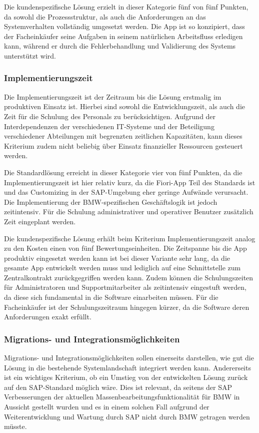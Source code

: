 Die kundenspezifische Lösung erzielt in dieser Kategorie fünf von fünf Punkten, da sowohl die Prozessstruktur, als auch die Anforderungen an das Systemverhalten vollständig umgesetzt werden. Die App ist so konzipiert, dass der Facheinkäufer seine Aufgaben in seinem natürlichen Arbeitsfluss erledigen kann, während er durch die Fehlerbehandlung und Validierung des Systems unterstützt wird. 

\subsubsection{Implementierungszeit}

Die Implementierungszeit ist der Zeitraum bis die Lösung erstmalig im produktiven Einsatz ist. Hierbei sind sowohl die Entwicklungszeit, als auch die Zeit für die Schulung des Personals zu berücksichtigen. Aufgrund der Interdependenzen der verschiedenen IT-Systeme und der Beteiligung verschiedener Abteilungen mit begrenzten zeitlichen Kapazitäten, kann dieses Kriterium zudem nicht beliebig über Einsatz finanzieller Ressourcen gesteuert werden.

Die Standardlösung erreicht in dieser Kategorie vier von fünf Punkten, da die Implementierungszeit ist hier relativ kurz, da die Fiori-App Teil des Standards ist und das Customizing in der SAP-Umgebung eher geringe Aufwände verursacht. Die Implementierung der BMW-spezifischen Geschäftslogik ist jedoch zeitintensiv. Für die Schulung administrativer und operativer Benutzer zusätzlich Zeit eingeplant werden.

Die kundenspezifische Lösung erhält beim Kriterium Implementierungszeit analog zu den Kosten einen von fünf Bewertungseinheiten. Die Zeitspanne bis die App produktiv eingesetzt werden kann ist bei dieser Variante sehr lang, da die gesamte App entwickelt werden muss und lediglich auf eine Schnittstelle zum Zentralkontrakt zurückgegriffen werden kann. Zudem können die Schulungszeiten für Administratoren und Supportmitarbeiter als zeitintensiv eingestuft werden, da diese sich fundamental in die Software einarbeiten müssen. Für die Facheinkäufer ist der Schulungszeitraum hingegen kürzer, da die Software deren Anforderungen exakt erfüllt. 

\subsubsection{Migrations- und Integrationsmöglichkeiten}

Migrations- und Integrationsmöglichkeiten sollen einerseits darstellen, wie gut die Lösung in die bestehende Systemlandschaft integriert werden kann. Andererseits ist ein wichtiges Kriterium, ob ein Umstieg von der entwickelten Lösung zurück auf den SAP-Standard möglich wäre. Dies ist relevant, da seitens der SAP Verbesserungen der aktuellen Massenbearbeitungsfunktionalität für BMW in Aussicht gestellt wurden und es in einem solchen Fall aufgrund der Weiterentwicklung und Wartung durch SAP nicht durch BMW getragen werden müsste.

